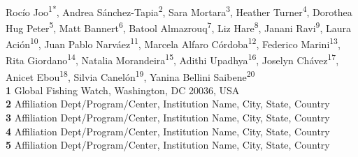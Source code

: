 \documentclass[10pt,letterpaper]{article}
\begin{document}
\newcommand{\fede}[1]{\textcolor{ForestGreen}{Fede: #1}}
\newcommand{\rocio}[1]{\textcolor{MidnightBlue}{Rocio: #1}}
\newcommand{\doro}[1]{\textcolor{RedViolet}{Dorothea: #1}}
\newcommand{\jani}[1]{\textcolor{YellowOrange}{Janina: #1}}
\newcommand{\la}[1]{\textcolor{RawSienna}{Laura: #1}}
\newcommand{\as}[1]{\textcolor{Violet}{Andrea: #1}}
\newcommand{\rita}[1]{\textcolor{CarnationPink}{Rita: #1}}

\vspace*{0.2in}

\begin{flushleft}
{\Large
\textbf{} %
}
\newline
\\
Rocío Joo\textsuperscript{1*}, %
Andrea Sánchez-Tapia\textsuperscript{2},
Sara Mortara\textsuperscript{3},
Heather Turner\textsuperscript{4}, %
Dorothea Hug Peter\textsuperscript{5}, %
Matt Bannert\textsuperscript{6},
Batool Almazrouq\textsuperscript{7},
Liz Hare\textsuperscript{8},
Janani Ravi\textsuperscript{9},
Laura Ación\textsuperscript{10},
Juan Pablo Narváez\textsuperscript{11},
Marcela Alfaro Córdoba\textsuperscript{12},
Federico Marini\textsuperscript{13},
Rita Giordano\textsuperscript{14},
Natalia Morandeira\textsuperscript{15},
Adithi Upadhya\textsuperscript{16},
Joselyn Chávez\textsuperscript{17\Yinyang},
Anicet Ebou\textsuperscript{18\Yinyang},
Silvia Canelón\textsuperscript{19\Yinyang},
Yanina Bellini Saibene\textsuperscript{20}%
\\
\bigskip
\textbf{1} Global Fishing Watch, Washington, DC 20036, USA
\\
\textbf{2} Affiliation Dept/Program/Center, Institution Name, City, State, Country
\\
\textbf{3} Affiliation Dept/Program/Center, Institution Name, City, State, Country
\\
\textbf{4} Affiliation Dept/Program/Center, Institution Name, City, State, Country
\\
\textbf{5} Affiliation Dept/Program/Center, Institution Name, City, State, Country
\\

\end{flushleft}
\end{document}

